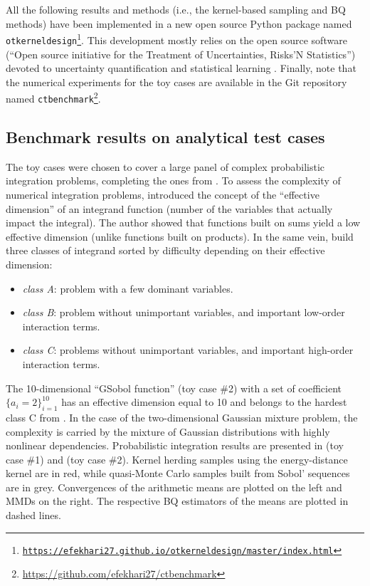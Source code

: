 All the following results and methods (i.e., the kernel-based sampling and BQ methods) have been implemented in a new open source Python package named \texttt{otkerneldesign\footnote{\href{https://efekhari27.github.io/otkerneldesign/master/index.html}{https://efekhari27.github.io/otkerneldesign/master/index.html}}}. 
This development mostly relies on the open source software \ots(``Open source initiative for the Treatment of Uncertainties, Risks'N Statistics'') devoted to uncertainty quantification and statistical learning \citep{baudin_dutfoy_2017}. 
Finally, note that the numerical experiments for the toy cases are available in the Git repository named \texttt{ctbenchmark}\footnote{\href{https://github.com/efekhari27/ctbenchmark}{https://github.com/efekhari27/ctbenchmark}}. 


\subsection{Benchmark results on analytical test cases}
The toy cases were chosen to cover a large panel of complex probabilistic integration problems, completing the ones from \cite{fekhari_renew_2022}.
To assess the complexity of numerical integration problems, \cite{owen_2003} introduced the concept of the ``effective dimension'' of an integrand function (number of the variables that actually impact the integral). 
The author showed that functions built on sums yield a low effective dimension (unlike functions built on products). 
In the same vein, \cite{kucherenko_feil_2011} build three classes of integrand sorted by difficulty depending on their effective dimension: \begin{itemize}
    \item \emph{class A}: problem with a few dominant variables.
    \item \emph{class B}: problem without unimportant variables, and important low-order interaction terms.
    \item \emph{class C}: problems without unimportant variables, and important high-order interaction terms. 
\end{itemize}
The 10-dimensional ``GSobol function'' (toy case \#2) with a set of coefficient $\{a_i=2\}_{i=1}^{10}$ has an effective dimension equal to 10 and belongs to the hardest class C from \cite{kucherenko_feil_2011}. 
In the case of the two-dimensional Gaussian mixture problem, the complexity is carried by the mixture of Gaussian distributions with highly nonlinear dependencies.
Probabilistic integration results are presented in  (toy case \#1) and  (toy case \#2). 
Kernel herding samples using the energy-distance kernel are in red, while quasi-Monte Carlo samples built from Sobol' sequences are in grey. 
Convergences of the arithmetic means are plotted on the left and MMDs on the right. 
The respective BQ estimators of the means are plotted in dashed lines. 

